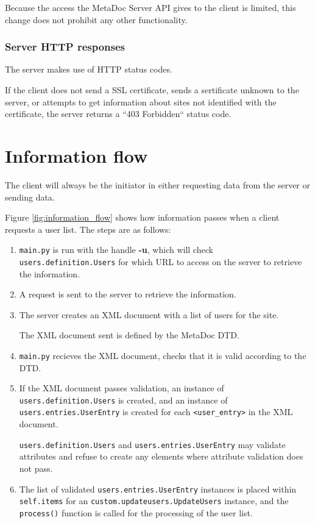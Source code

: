 \documentclass[titlepage, a4paper,10pt]{article}
\begin{document}
Because the access the MetaDoc Server API gives to the client is limited, this 
change does not prohibit any other functionality. 

\subsubsection{Server HTTP responses}

The server makes use of HTTP status codes.

If the client does not send a SSL certificate, sends a sertificate unknown to 
the server, or attempts to get information about sites not identified with the
certificate, the server returns a ``403 Forbidden`` status code.

\newpage
\section{Information flow}

The client will always be the initiator in either requesting data from the
server or sending data. 

Figure \ref{fig:information_flow} shows how information passes when a client
requests a user list. The steps are as follows:

\begin{enumerate}
    \item
        \texttt{main.py} is run with the handle \textbf{-u}, which will check
        \texttt{users.definition.Users} for which URL to access on the server
        to retrieve the information.
    \item
        A request is sent to the server to retrieve the information.
    \item
        The server creates an XML document with a list of users for the site.
        
        The XML document sent is defined by the MetaDoc DTD.
    \item
        \texttt{main.py} recieves the XML document, checks that it is valid
        according to the DTD. 
    \item
        If the XML document passes validation, an instance of
        \texttt{users.definition.Users} is created, and an instance of
        \texttt{users.entries.UserEntry} is created for each
        \texttt{<user\_entry>} in the XML document.

        \texttt{users.definition.Users} and \texttt{users.entries.UserEntry}
        may validate attributes and refuse to create any elements where
        attribute validation does not pass.
    \item
        The list of validated \texttt{users.entries.UserEntry} instances is
        placed within \texttt{self.items} for an
        \texttt{custom.updateusers.UpdateUsers} instance, and the
        \texttt{process()} function is called for the processing of the user
        list.
\end{enumerate}
\end{document}
